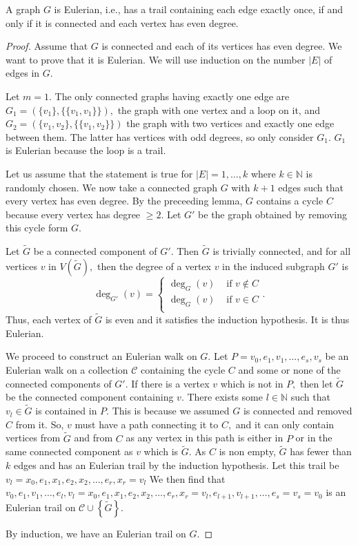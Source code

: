 \begin{theorem}
	A graph $G$ is Eulerian, i.e., has a trail containing each edge exactly once, if and only if it is connected and each vertex has even degree.
\end{theorem}
\begin{proof}
	Assume that $G$ is connected and each of its vertices has even degree. We want to prove that it is Eulerian. We will use induction on the number $ \lvert E \rvert$ of edges in $G.$

	Let $m = 1.$ The only connected graphs having exactly one edge are $ G_1 =  ( \{v_1\}, \{\{v_1,v_1\}\} ),$ the graph with one vertex and a loop on it, and $G_2 = ( \{v_1, v_2\}, \{\{v_1,v_2\}\})$ the graph with two vertices and exactly one edge between them. The latter has vertices with odd degrees, so only consider $G_1.$
$G_1$ is Eulerian because the loop is a trail.

Let us assume that the statement is true for $ \lvert E \rvert = 1, \dotsc, k$ where $k \in \mathbb{N}$ is randomly chosen.
We now take a connected graph $G$ with $k+1$ edges such that every vertex has even degree.
By the preceeding lemma, $G$ contains a cycle $C$ because every vertex has degree $\geq 2.$
Let $G'$ be the graph obtained by removing this cycle form $G.$

Let $\tilde{G}$ be a connected component of $G'.$
Then $\tilde{G}$ is trivially connected, and for all vertices $v$ in $V(\tilde{G}),$
then the degree of a vertex $v$ in the induced subgraph $G'$ is $$ \deg_{G'}(v) =
\begin{cases}
	\deg_G(v) & \text{ if } v \not \in C \\
	\deg_G(v) & \text{ if } v \in C \\
\end{cases}.$$
Thus, each vertex of $\tilde{G}$ is even and it satisfies the induction hypothesis.
It is thus Eulerian.

We proceed to construct an Eulerian walk on $G.$
Let $P = v_0, e_1, v_1, \dotsc, e_s, v_s$ be an Eulerian walk on a collection $ \mathcal{C}$
containing
the cycle $C$ and some or none of the connected components of $G'.$
If there is a vertex $v$ which is not in $P,$ then let $\tilde{G}$ be the connected component 
containing $v.$
There exists some $l \in \mathbb{N}$ such that $v_l \in \tilde{G}$ is contained in $P.$
This is because we assumed $G$ is connected and removed $C$ from it.
So, $v$ must have a path connecting it to $C,$ and it can only contain vertices
from $\tilde{G}$ and from $C$ as any vertex in this path is either in $P$ 
or in the same connected component as $v$ which is $\tilde{G}.$
As $C$ is non empty, $\tilde{G}$ has fewer than $k$ edges and has an Eulerian trail
by the induction hypothesis. Let this trail be 
$ v_l = x_0, e_1, x_1, e_2, x_2, \dotsc, e_r, x_r = v_l$
We then find that 
$  v_0, e_1, v_1, \dotsc, e_l,v_l = x_0, e_1, x_1, e_2, x_2, \dotsc, e_r, x_r = v_l, e_{l+1}, v_{l+1}, \dotsc, 
e_s = v_s = v_0$
is an Eulerian trail on $\mathcal{C} \cup \left\{ \tilde{G} \right\}.$

By induction, we have an Eulerian trail on $G.$

\end{proof}


